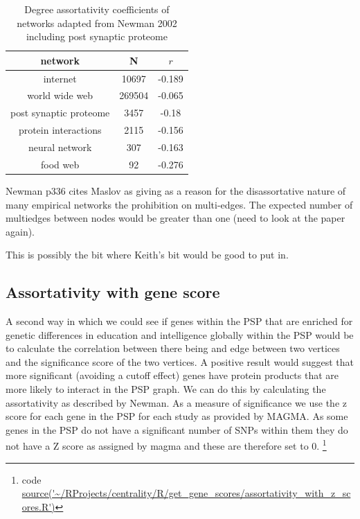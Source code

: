 \begin{table}[]
    \centering
    \begin{tabular}{c|c|c}
       network  &N& $r$  \\
       \hline
       internet & 10697&-0.189\\
       world wide web &269504 & -0.065\\
       post synaptic proteome & 3457 & -0.18\\
       protein interactions & 2115 & -0.156\\
       neural network & 307 & -0.163\\
       food web & 92 & -0.276 \\
       
       
         
    \end{tabular}
    \caption{Degree assortativity coefficients of networks adapted from Newman 2002 \cite{newman2002assortative} including post synaptic proteome}
    \label{Table:DegreeAssortativityNewman}
\end{table}

 


Newman \cite{newman2018networks} p336 cites Maslov \cite{maslov2004detection} as giving as a reason for the disassortative nature of many empirical networks the prohibition on multi-edges. The expected number of multiedges between nodes would be greater than one (need to look at the paper again).

This is possibly the bit where Keith's bit would be good to put in.  
%
%
%

\subsection{Assortativity with gene score}
 
A second way in which we could see if genes within the PSP that are enriched for genetic differences in education and intelligence globally within the PSP would be to calculate the correlation between there being and edge between two vertices and the significance score of the two vertices. A positive result would suggest that more significant (avoiding a cutoff effect) genes have protein products that are more likely to interact in the PSP graph. We can do this by calculating the assortativity as described by Newman. As a measure of significance we use the z score for each gene in the PSP for each study as provided by MAGMA. As some genes in the PSP do not have a significant number of SNPs within them they do not have a Z score as assigned by magma and these are therefore set to 0. \footnote{code \url{source('~/RProjects/centrality/R/get_gene_scores/assortativity_with_z_scores.R')} }

